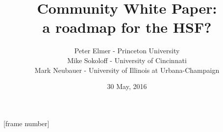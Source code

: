 \documentclass{beamer}
\title{Community White Paper: \\ a roadmap for the HSF?}
\author{Peter Elmer - Princeton University \\
        Mike Sokoloff - University of Cincinnati \\
        Mark Neubauer - University of Illinois at Urbana-Champaign}
\date{30 May, 2016}
\begin{document}
\maketitle

%
%

[frame number]












%



%
%
%
%











\end{document}

